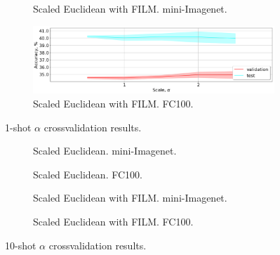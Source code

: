 \documentclass{article}
\begin{document}
\begin{figure}[t]
\begin{subfigure}[t]{0.49\textwidth}
        \caption{Scaled Euclidean with FILM. mini-Imagenet.}
        \label{fig:scaled_euclidean_with_tbn_miniimagenet_1shot}
    \end{subfigure}
    \begin{subfigure}[t]{0.49\textwidth}
        \includegraphics[width=\textwidth]{scale_crossvalidation_cbn_CIFAR100_1shot.png}
        \caption{Scaled Euclidean with FILM. FC100.}
        \label{fig:scaled_euclidean_with_tbn_cifar100_1shot}
    \end{subfigure}
    \caption{1-shot $\alpha$ crossvalidation results.}
    \label{fig:metric_scaling_1shot}
\end{figure}


\begin{figure}[t]
%
    \centering
    \begin{subfigure}[t]{0.49\textwidth}
        \caption{Scaled Euclidean. mini-Imagenet.}
        \label{fig:scaled_euclidean_miniimagenet_10shot}
    \end{subfigure}
    \begin{subfigure}[t]{0.49\textwidth}
        \caption{Scaled Euclidean. FC100.}
        \label{fig:scaled_euclidean_cifar100_10shot}
    \end{subfigure}
    \begin{subfigure}[t]{0.49\textwidth}
        \caption{Scaled Euclidean with FILM. mini-Imagenet.}
        \label{fig:scaled_euclidean_with_tbn_miniimagenet_10shot}
    \end{subfigure}
    \begin{subfigure}[t]{0.49\textwidth}
        \caption{Scaled Euclidean with FILM. FC100.}
        \label{fig:scaled_euclidean_with_tbn_cifar100_10shot}
    \end{subfigure}
    \caption{10-shot $\alpha$ crossvalidation results.}
    \label{fig:metric_scaling_10shot}
\end{figure}
\fi
\end{document}
